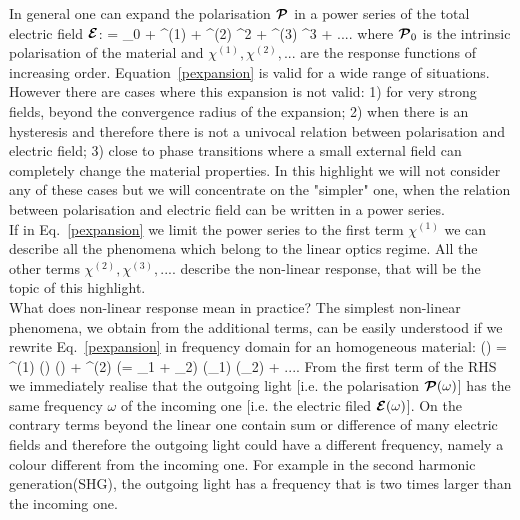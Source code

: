 In general one can expand the polarisation  ${\boldsymbol {\cal P}}$ in a power series of the total electric field ${\boldsymbol {\cal E}}$: 
\be
\PPc = \PPc_0 + \chi^{(1)} \EEc + \chi^{(2)} \EEc^2 + \chi^{(3)} \EEc^3 + ....
\label{pexpansion}
\ee
where ${\boldsymbol {\cal P}}_0$ is the intrinsic polarisation of the material and  $\chi^{(1)}, \chi^{(2)},...$ are the response functions of increasing order. Equation~\ref{pexpansion} is valid for a wide range of situations. However there are cases where this expansion is not valid: 1) for very strong fields, beyond the convergence radius of the expansion\cite{lee2014first}; 2) when there is an hysteresis and therefore there is not a univocal relation between polarisation and electric field; 3) close to phase transitions where a small external field can completely change the material properties. In this highlight we will not consider any of these cases but we will concentrate on the "simpler" one, when the relation between polarisation and electric field can be written in a power series.\\ 
If in Eq.~\ref{pexpansion} we limit the power series to the first term $\chi^{(1)}$ we can describe all the phenomena which belong to the linear optics regime. All the other terms  $\chi^{(2)}, \chi^{(3)},.... $  describe the non-linear response, that will be the topic of this highlight. \\
What does non-linear response mean in practice?  The simplest non-linear phenomena, we obtain from the additional terms,  can be easily understood if we rewrite Eq.~\ref{pexpansion} in frequency domain for an homogeneous material:
\be
\PPc(\omega) = \chi^{(1)} (\omega) \EEc(\omega)  + \chi^{(2)} (\omega = \omega_1 + \omega_2) \EEc(\omega_1) \EEc(\omega_2) + ....
\label{pexpomega}
\ee
From the first term of the RHS we immediately realise that the outgoing light [i.e. the polarisation ${\boldsymbol {\cal P}} (\omega)$] has the same frequency $\omega$ of the incoming one [i.e. the electric filed ${\boldsymbol {\cal E}} (\omega)$]. On the contrary terms beyond the linear one contain sum or difference of many electric fields and therefore the outgoing light could have a different frequency, namely a colour different from the incoming one.  For example in the second harmonic generation(SHG), the outgoing light has a frequency that is two times larger than the incoming one. \\
